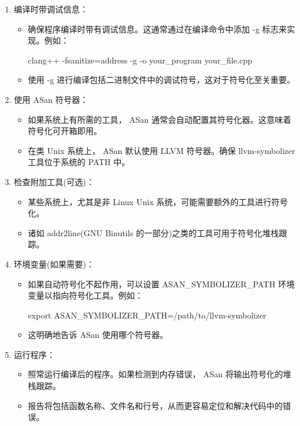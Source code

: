 \begin{enumerate}
\item
编译时带调试信息：

\begin{itemize}
\item
确保程序编译时带有调试信息。这通常通过在编译命令中添加 -g 标志来实现。例如：

\begin{shell}
clang++ -fsanitize=address -g -o your_program your_file.cpp
\end{shell}

\item
使用 -g 进行编译包括二进制文件中的调试符号，这对于符号化至关重要。
\end{itemize}

\item
使用 ASan 符号器：

\begin{itemize}
\item
如果系统上有所需的工具， ASan 通常会自动配置其符号化器。这意味着符号化可开箱即用。

\item
在类 Unix 系统上， ASan 默认使用 LLVM 符号器。确保 llvm-symbolizer 工具位于系统的 PATH 中。
\end{itemize}

\item
检查附加工具(可选)：

\begin{itemize}
\item
某些系统上，尤其是非 Linux Unix 系统，可能需要额外的工具进行符号化。

\item
诸如 addr2line(GNU Binutils 的一部分)之类的工具可用于符号化堆栈跟踪。
\end{itemize}

\item
环境变量(如果需要)：

\begin{itemize}
\item
如果自动符号化不起作用，可以设置 ASAN\_SYMBOLIZER\_PATH 环境变量以指向符号化工具。例如：

\begin{shell}
export ASAN_SYMBOLIZER_PATH=/path/to/llvm-symbolizer
\end{shell}

\item
这明确地告诉 ASan 使用哪个符号器。
\end{itemize}

\item
运行程序：

\begin{itemize}
\item
照常运行编译后的程序。如果检测到内存错误， ASan 将输出符号化的堆栈跟踪。

\item
报告将包括函数名称、文件名和行号，从而更容易定位和解决代码中的错误。
\end{itemize}
\end{enumerate}


